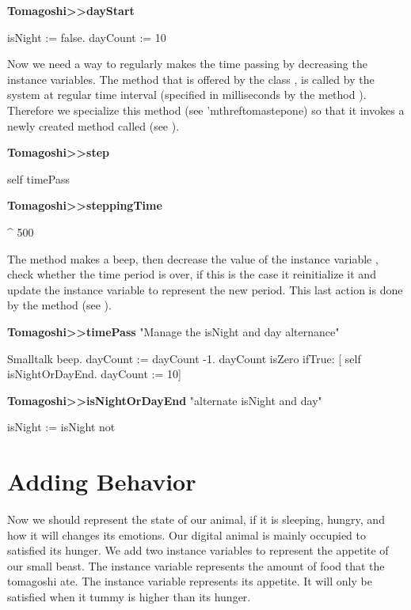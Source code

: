 \begin{method}\label{mth:initOne}
\textbf{Tomagoshi>>dayStart}

   isNight := false.
   dayCount := 10
\end{method}

Now we need a way to regularly makes the time passing by decreasing the  instance variables. 
The method  that is offered by the class , is called by the system at regular time interval 
(specified in milliseconds by the method ). Therefore we specialize this method (see 'mthref{tomastepone})
 so that it invokes a newly created method called  (see ).

\begin{method}\label{mth:tomastepone}
\textbf{Tomagoshi>>step}

   self timePass
\end{method}

\begin{method}\label{mth:}
\textbf{Tomagoshi>>steppingTime}

   ^ 500
\end{method}

The method  makes a beep, then decrease the value of the instance variable , check whether the 
time period is over, if this is the case it reinitialize it and update the instance variable  to represent  the new period. This last action is done by the method  (see ). 

\begin{method}\label{mth:timePassOne}
\textbf{Tomagoshi>>timePass}
   "Manage the isNight and day alternance"

   Smalltalk beep. 
   dayCount := dayCount -1.
   dayCount isZero
      ifTrue:
          [ self isNightOrDayEnd. 
          dayCount := 10]
\end{method}

\begin{method}\label{mth:isNightOrDayEnd}
\textbf{Tomagoshi>>isNightOrDayEnd}
  "alternate isNight and day"

   isNight := isNight not
\end{method}


\section{Adding Behavior}
Now we should represent the state of our animal, if it is sleeping, hungry, and how it will changes its emotions. 
Our digital animal is mainly occupied to satisfied its hunger.  We add two instance variables to represent the appetite of our small beast. The instance variable  represents the amount of food that the tomagoshi ate. The instance variable  represents its appetite. It will only be satisfied when it tummy is higher than its hunger. 


